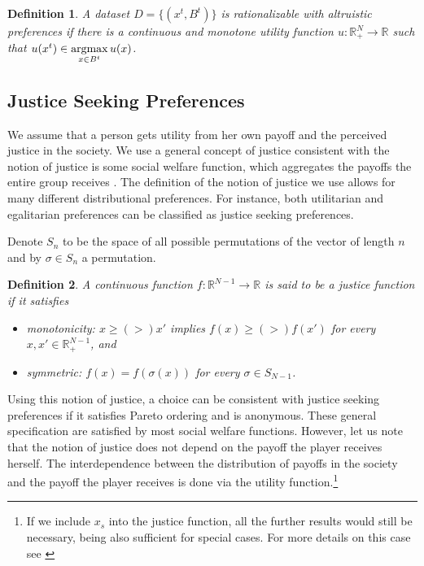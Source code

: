 \documentclass[12pt,dvipsnames]{amsart}
\newtheorem{defn}{Definition}
\newcommand{\R}{\mathbb{R}}
\newcommand{\argmax}{\operatornamewithlimits{argmax}}
\begin{document}
\begin{defn}
\label{def:OR}
A dataset $D=\{(x^t,B^t)\}$ is rationalizable with altruistic preferences if there is a continuous and monotone utility function $u:\R^N_+\rightarrow \R$ such that $u(x^t) \in \argmax\limits_{x\in B^t} u(x)$.
\end{defn}


\subsection{Justice Seeking Preferences}
We assume that a person gets utility from her own payoff and the perceived justice in the society. We use a general concept of justice consistent with the notion of justice is some social welfare function, which aggregates the payoffs
the entire group receives \cite{becker2013revealed}. The definition of the notion of justice we use allows for many different distributional preferences. For instance, both utilitarian and egalitarian preferences can be
classified as justice seeking preferences. 


Denote $S_n$ to be the space of all possible permutations of the vector of length $n$ and by $\sigma\in S_n$ a permutation.

\begin{defn}
\label{def:NotionOfJustice}
A continuous function $f:\R^{N-1}\rightarrow \R$ is said to be a justice function if it satisfies
\begin{itemize}
	\item monotonicity: $x\geq (>) x'$ implies $f(x)\geq (>) f(x')$ for every $x,x'\in \R^{N-1}_+$, and
	\item symmetric: $f(x)=f(\sigma(x))$ for every $\sigma\in S_{N-1}$.
\end{itemize} 
\end{defn}

Using this notion of justice, a choice can be consistent with justice seeking
preferences if it satisfies Pareto ordering and is anonymous. 
These general specification are satisfied by
most social welfare functions. However, let us note that the notion of
justice does not depend on the payoff the player receives herself. The 
interdependence between the distribution of payoffs in the
society and the payoff the player receives is done via the utility
function.\footnote{
	If we include $x_s$ into the justice function, all the further results would still be necessary, being also sufficient for special cases.
	For more details on this case see \cite{becker2013revealed}
}
\end{document}

